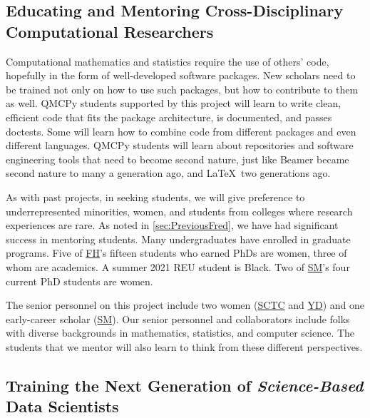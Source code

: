\documentclass[11pt]{NSFamsart}
\newcommand{\cmtS}[1]{{\color{blue}{(Simon: #1)}}}
\newcommand{\FH}{\hyperlink{FHlink}{FH}\xspace}
\newcommand{\SM}{\hyperlink{SMlink}{SM}\xspace}
\newcommand{\SCTC}{\hyperlink{SCTClink}{SCTC}\xspace}
\newcommand{\YD}{\hyperlink{YDlink}{YD}\xspace}
\begin{document}
\subsection{Educating and Mentoring Cross-Disciplinary Computational Researchers}
Computational mathematics and statistics require the use of others' code, hopefully in the form of well-developed software packages.  New scholars need to be trained not only on how to use such packages, but how to contribute to them as well.  QMCPy students supported by this project will learn to write clean, efficient code that fits the package architecture, is documented, and passes doctests.  Some will learn how to combine code from different packages and even different languages.  QMCPy students will learn about repositories and software engineering tools that need to become second nature, just like Beamer became second nature to many a generation ago, and \LaTeX\ two generations ago.

\cmtS{may need to buff up a bit on DEI (I think this was a comment in prior reviews): } As with past projects, in seeking students, we will give preference to underrepresented minorities, women, and students from colleges where research experiences are rare.  As noted in \cref{sec:PreviousFred}, we have had significant success in mentoring students.  Many undergraduates have enrolled in graduate programs.  Five of \FH's fifteen students who earned PhDs are women, three of whom are academics. A  summer 2021 REU student is Black.  Two of \SM's four current PhD students are women.  

The senior personnel on this project include two women (\SCTC and \YD) and one early-career scholar (\SM).  Our senior personnel and collaborators include folks with diverse backgrounds in mathematics, statistics, and computer science.  The students  that we mentor will also learn to think from these different perspectives.

\cmtS{Further emphasis on multi-disciplinary education for the sciences? Some sample writing below}


\subsection*{Training the Next Generation of {\em Science-Based} Data Scientists}
\end{document}
